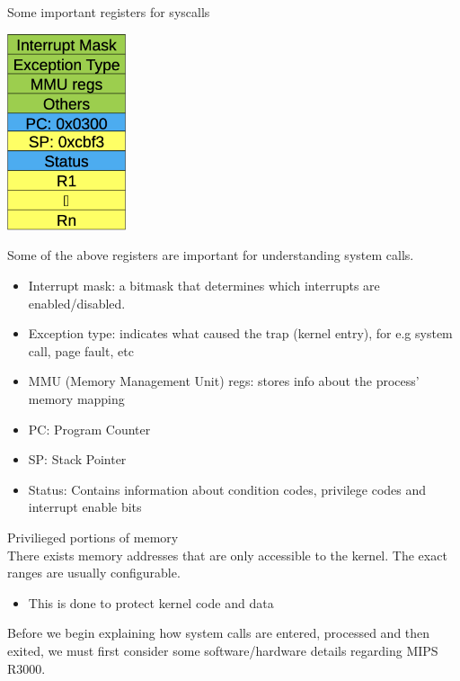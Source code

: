 \documentclass[journal, letterpaper]{IEEEtran}
\begin{document}
\begin{theory}{Some important registers for syscalls}
    \begin{center}
        \includegraphics[width=3.5cm]{./photos/registers.png}
    \end{center}
    Some of the above registers are important for understanding system calls.
    \begin{itemize}
        \item Interrupt mask: a bitmask that determines which interrupts are enabled/disabled.
        \item Exception type: indicates what caused the trap (kernel entry), for e.g system call, page fault, etc
        \item MMU (Memory Management Unit) regs: stores info about the process' memory mapping
        \item PC: Program Counter
        \item SP: Stack Pointer
        \item Status: Contains information about condition codes, privilege codes and interrupt enable bits
    \end{itemize}
\end{theory}
\begin{aside}{Privilieged portions of memory} \\ 
    There exists memory addresses that are only accessible to the kernel. The exact ranges are usually configurable.
    \begin{itemize}
        \item This is done to protect kernel code and data
    \end{itemize}
\end{aside}
Before we begin explaining how system calls are entered, processed and then exited, we must first consider some software/hardware details regarding MIPS R3000.
\end{document}
